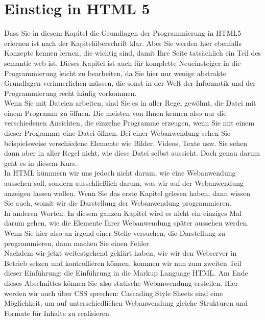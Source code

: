 \chapter{Einstieg in HTML 5}

Dass Sie in diesem Kapitel die Grundlagen der Programmierung in HTML5 erlernen ist nach der Kapitelüberschrift klar. Aber Sie werden hier ebenfalls Konzepte kennen lernen, die wichtig sind, damit Ihre Seite tatsächlich ein Teil des semantic web ist. Dieses Kapitel ist auch für komplette Neueinsteiger in die Programmierung leicht zu bearbeiten, da Sie hier nur wenige abstrakte Grundlagen verinnerlichen müssen, die sonst in der Welt der Informatik und der Programmierung recht häufig vorkommen.\\

Wenn Sie mit Dateien arbeiten, sind Sie es in aller Regel gewöhnt, die Datei mit einem Programm zu öffnen. Die meisten von Ihnen kennen also nur die verschiedenen Ansichten, die einzelne Programme erzeugen, wenn Sie mit einem dieser Programme eine Datei öffnen. Bei einer Webanwendung sehen Sie beispielsweise verschiedene Elemente wie Bilder, Videos, Texte usw. Sie sehen dann aber in aller Regel nicht, wie diese Datei selbst aussieht. Doch genau darum geht es in diesem Kurs.\\

In HTML kümmern wir uns jedoch nicht darum, wie eine Webanwendung aussehen soll, sondern ausschließlich darum, was wir auf der Webanwendung anzeigen lassen wollen. Wenn Sie das erste Kapitel gelesen haben, dann wissen Sie auch, womit wir die Darstellung der Webanwendung programmieren. \\

In anderen Worten: In diesem ganzen Kapitel wird es nicht ein einziges Mal darum gehen, wie die Elemente Ihrer Webanwendung später aussehen werden. Wenn Sie hier also an irgend einer Stelle versuchen, die Darstellung zu programmieren, dann machen Sie einen Fehler.\\

Nachdem wir jetzt weitestgehend geklärt haben, wie wir den Webserver in Betrieb setzen und kontrollieren können, kommen wir nun zum zweiten Teil dieser Einführung: die Einführung in die Markup Language HTML. Am Ende dieses Abschnittes können Sie also statische Webanwendung erstellen. Hier werden wir auch über CSS sprechen: Cascading Style Sheets sind eine Möglichkeit, um auf unterschiedlichen Webanwendung gleiche Strukturen und Formate für Inhalte zu realisieren.\\

